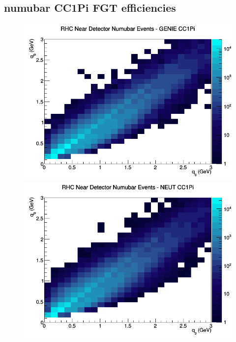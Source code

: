\documentclass[12pt]{article}
\begin{document}
\subsection{numubar CC1Pi FGT efficiencies}
\begin{figure}[h]
\includegraphics[width=\linewidth]{eff_q0_q3/FGT/CC1Pi_RHC_ND_numubar_q3_q0_GENIE.png}
\endminipage
{}
\includegraphics[width=\linewidth]{eff_q0_q3/FGT/CC1Pi_RHC_ND_numubar_q3_q0_NEUT.png}
\endminipage
{}

\end{figure}
\end{document}
